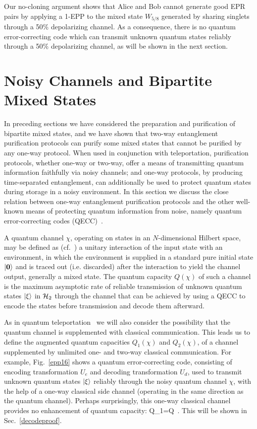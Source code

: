 Our no-cloning argument shows that Alice and Bob cannot generate good
EPR pairs by applying a 1-EPP to the mixed state $W_{5/8}$ generated
by sharing singlets through a 50\% depolarizing channel.  As a 
consequence, there is no quantum error-correcting code which can
transmit unknown quantum states reliably through
a 50\% depolarizing channel, as will be shown in the next
section. 
 
\section{Noisy Channels and Bipartite Mixed States}\label{CandM} In
preceding sections we have considered the preparation and purification
of bipartite mixed states, and we have shown that two-way entanglement
purification protocols can purify some mixed states that cannot be
purified by any one-way protocol.  When used in conjunction with
teleportation, purification protocols, whether one-way or two-way, offer
a means of transmitting quantum information faithfully via noisy
channels; and one-way protocols, by producing time-separated
entanglement, can additionally be used to protect quantum states during
storage in a noisy environment.   In this section we discuss the close
relation between one-way entanglement purification protocols and the
other well-known means of protecting quantum information from noise,
namely quantum error-correcting
codes (QECC)~\cite{ChuangLaf,shellgame,CS,Steane,Laflamme,EM,Sam,balance,newest}. 
 
A quantum channel $\chi$,
operating on states in an $N$-dimensional Hilbert space, may be defined
as (cf.~\cite{shellgame}) a unitary interaction of the input state with an
environment, in which the environment is supplied in a standard pure
initial state $| \mbox{\boldmath{$0$}} \rangle$ and is traced out 
(i.e. discarded) after
the interaction to yield the channel output,
generally a mixed state.  The quantum capacity $Q(\chi)$ of such a channel
is the maximum asymptotic rate of reliable transmission of unknown quantum states 
$| \xi \rangle$ in ${\cal H}_2$ through the channel that can be achieved by using
a QECC to encode the states before transmission and decode them afterward.
 
 
As in quantum teleportation~\cite{teleportation} we will also consider
the possibility that the quantum channel is supplemented with
classical communication.  This leads us to define the augmented quantum
capacities $Q_1(\chi)$ and $Q_2(\chi)$, of a channel supplemented
by unlimited one- and two-way classical communication. For example,
Fig.~\ref{epp16} shows a quantum error-correcting code, consisting
of encoding transformation $U_e$ and decoding transformation $U_d$, used
to transmit unknown quantum states $| \xi \rangle$ reliably through the
noisy quantum channel $\chi$, with the help of a one-way classical
side channel (operating in the same direction as the quantum channel).
Perhaps surprisingly, this one-way classical channel provides no
enhancement of quantum capacity:
\beq
Q_1=Q\ .\label{qequalsq1}
\eeq
This will be shown in Sec.~\ref{decodeproof}.
 
